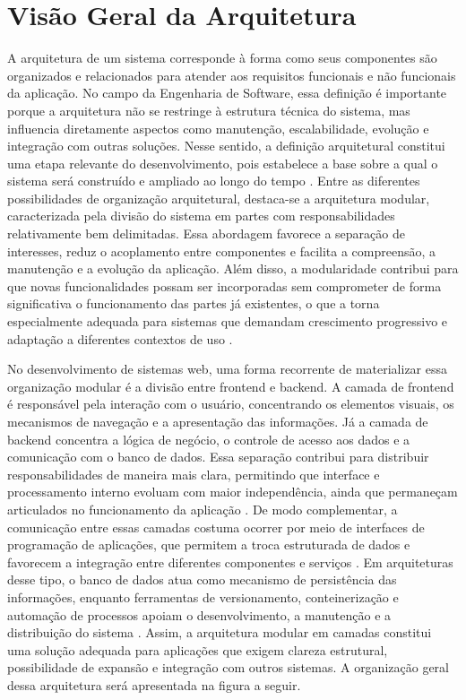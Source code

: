\section{Visão Geral da Arquitetura}

A arquitetura de um sistema corresponde à forma como seus componentes são organizados e relacionados para atender aos requisitos funcionais e não funcionais da aplicação. No campo da Engenharia de Software, essa definição é importante porque a arquitetura não se restringe à estrutura técnica do sistema, mas influencia diretamente aspectos como manutenção, escalabilidade, evolução e integração com outras soluções. Nesse sentido, a definição arquitetural constitui uma etapa relevante do desenvolvimento, pois estabelece a base sobre a qual o sistema será construído e ampliado ao longo do tempo \cite{sommerville2016,swebok2024}.
Entre as diferentes possibilidades de organização arquitetural, destaca-se a arquitetura modular, caracterizada pela divisão do sistema em partes com responsabilidades relativamente bem delimitadas. Essa abordagem favorece a separação de interesses, reduz o acoplamento entre componentes e facilita a compreensão, a manutenção e a evolução da aplicação. Além disso, a modularidade contribui para que novas funcionalidades possam ser incorporadas sem comprometer de forma significativa o funcionamento das partes já existentes, o que a torna especialmente adequada para sistemas que demandam crescimento progressivo e adaptação a diferentes contextos de uso \cite{sommerville2016,swebok2024}.

No desenvolvimento de sistemas web, uma forma recorrente de materializar essa organização modular é a divisão entre frontend e backend. A camada de frontend é responsável pela interação com o usuário, concentrando os elementos visuais, os mecanismos de navegação e a apresentação das informações. Já a camada de backend concentra a lógica de negócio, o controle de acesso aos dados e a comunicação com o banco de dados. Essa separação contribui para distribuir responsabilidades de maneira mais clara, permitindo que interface e processamento interno evoluam com maior independência, ainda que permaneçam articulados no funcionamento da aplicação \cite{sommerville2016,swebok2024}.
De modo complementar, a comunicação entre essas camadas costuma ocorrer por meio de interfaces de programação de aplicações, que permitem a troca estruturada de dados e favorecem a integração entre diferentes componentes e serviços \cite{sommerville2016,swebok2024}. Em arquiteturas desse tipo, o banco de dados atua como mecanismo de persistência das informações, enquanto ferramentas de versionamento, conteinerização e automação de processos apoiam o desenvolvimento, a manutenção e a distribuição do sistema \cite{chacon2014,docker2026,gitlabcicd2026}. Assim, a arquitetura modular em camadas constitui uma solução adequada para aplicações que exigem clareza estrutural, possibilidade de expansão e integração com outros sistemas. A organização geral dessa arquitetura será apresentada na figura a seguir.

